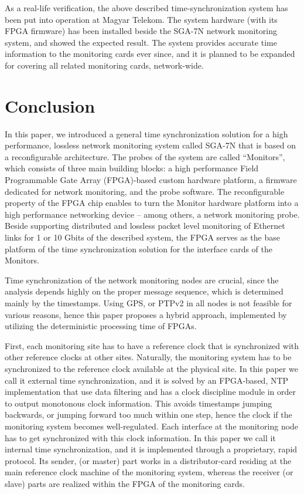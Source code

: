 \documentclass[journal]{IEEEtran}
\begin{document}
As a real-life verification, the above described time-synchronization system has been put into operation at Magyar Telekom. The system hardware (with its FPGA firmware) has been installed beside the SGA-7N network monitoring system, and showed the expected result. The system provides accurate time information to the monitoring cards ever since, and it is planned to be expanded for covering all related monitoring cards, network-wide.

\section{Conclusion}

In this paper, we introduced a general time synchronization solution for a high performance, lossless network monitoring system called SGA-7N that is based on a reconfigurable architecture. The probes of the system are called ``Monitors'', which consists of three main building blocks: a high performance Field Programmable Gate Array (FPGA)-based custom hardware platform, a firmware dedicated for network monitoring, and the probe software. The reconfigurable property of the FPGA chip enables to turn the Monitor hardware platform into a high performance networking device -- among others, a network monitoring probe. Beside supporting distributed and lossless packet level monitoring of Ethernet links for 1 or 10 Gbit\/s of the described system, the FPGA serves as the base platform of the time synchronization solution for the interface cards of the Monitors.

Time synchronization of the network monitoring nodes are crucial, since the analysis depends highly on the proper message sequence, which is determined mainly by the timestamps. Using GPS, or PTPv2 in all nodes is not feasible for various reasons, hence this paper proposes a hybrid approach, implemented by utilizing the deterministic processing time of FPGAs.

First, each monitoring site has to have a reference clock that is synchronized with other reference clocks at other sites. Naturally, the monitoring system has to be synchronized to the reference clock available at the physical site. In this paper we call it external time synchronization, and it is solved by an FPGA-based, NTP implementation that use data filtering and has a clock discipline module in order to output monotonous clock information. This avoids timestamps jumping backwards, or jumping forward too much within one step, hence the clock if the monitoring system becomes well-regulated. Each interface at the monitoring node has to get synchronized with this clock information. In this paper we call it internal time synchronization, and it is implemented through a proprietary, rapid protocol. Its sender, (or master) part works in a distributor-card residing at the main reference clock machine of the monitoring system, whereas the receiver (or slave) parts are realized within the FPGA of the monitoring cards.
\end{document}
